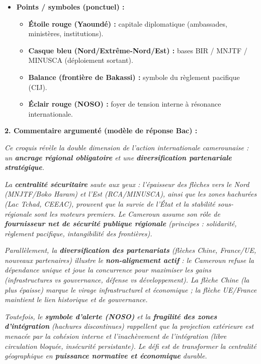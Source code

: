 \documentclass[11pt]{article}
\begin{document}
\begin{exoresolu}
\begin{itemize}
\begin{itemize}
    \end{itemize}
    \item \textbf{Points / symboles (ponctuel) :}
    \begin{itemize}
        \item \textbf{Étoile rouge (Yaoundé) :} capitale diplomatique (ambassades, ministères, institutions).
        \item \textbf{Casque bleu (Nord/Extrême-Nord/Est) :} bases BIR / MNJTF / MINUSCA (déploiement sortant).
        \item \textbf{Balance (frontière de Bakassi) :} symbole du règlement pacifique (CIJ).
        \item \textbf{Éclair rouge (NOSO) :} foyer de tension interne à résonance internationale.
    \end{itemize}
\end{itemize}

\textbf{2. Commentaire argumenté (modèle de réponse Bac) :}

\emph{Ce croquis révèle la double dimension de l'action internationale camerounaise : un \textbf{ancrage régional obligatoire} et une \textbf{diversification partenariale stratégique}.}

\emph{La \textbf{centralité sécuritaire} saute aux yeux : l'épaisseur des flèches vers le Nord (MNJTF/Boko Haram) et l'Est (RCA/MINUSCA), ainsi que les zones hachurées (Lac Tchad, CEEAC), prouvent que la survie de l'État et la stabilité sous-régionale sont les moteurs premiers. Le Cameroun assume son rôle de \textbf{fournisseur net de sécurité publique régionale} (principes : solidarité, règlement pacifique, intangibilité des frontières).}

\emph{Parallèlement, la \textbf{diversification des partenariats} (flèches Chine, France/UE, nouveaux partenaires) illustre le \textbf{non-alignement actif} : le Cameroun refuse la dépendance unique et joue la concurrence pour maximiser les gains (infrastructures vs gouvernance, défense vs développement). La flèche Chine (la plus épaisse) marque le virage infrastructurel et économique ; la flèche UE/France maintient le lien historique et de gouvernance.}

\emph{Toutefois, le \textbf{symbole d'alerte (NOSO)} et la \textbf{fragilité des zones d'intégration} (hachures discontinues) rappellent que la projection extérieure est menacée par la cohésion interne et l'inachèvement de l'intégration (libre circulation bloquée, insécurité persistante). Le défi est de transformer la centralité géographique en \textbf{puissance normative et économique} durable.}
\end{exoresolu}
\end{document}

